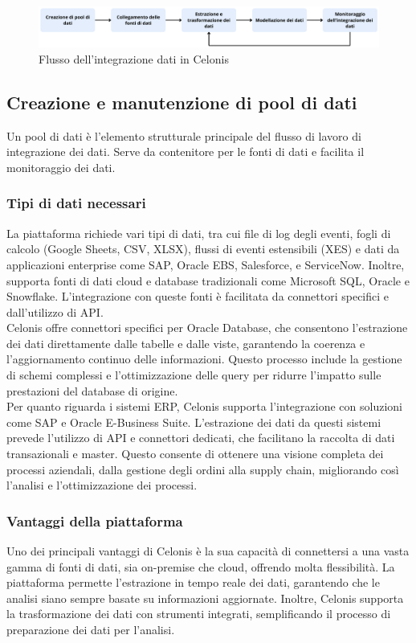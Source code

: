 \documentclass{article}
\begin{document}
\begin{figure}[H]
    \centering
    \includegraphics[width=\textwidth]{imgCelonis/IntegrazioneDati.png}
    \caption{Flusso dell'integrazione dati in Celonis}
    \label{fig:flusso-integrazione-dati-celonis}
\end{figure}

\subsection{Creazione e manutenzione di pool di dati}
Un pool di dati è l'elemento strutturale principale del flusso di lavoro di integrazione dei dati. Serve da contenitore per le fonti di dati e facilita il monitoraggio dei dati.

\subsubsection{Tipi di dati necessari}
La piattaforma richiede vari tipi di dati, tra cui file di log degli eventi, fogli di calcolo (Google Sheets, CSV, XLSX), flussi di eventi estensibili (XES) e dati da applicazioni enterprise come SAP, Oracle EBS, Salesforce, e ServiceNow. Inoltre, supporta fonti di dati cloud e database tradizionali come Microsoft SQL, Oracle e Snowflake. L'integrazione con queste fonti è facilitata da connettori specifici e dall'utilizzo di API.\\
Celonis offre connettori specifici per Oracle Database, che consentono l'estrazione dei dati direttamente dalle tabelle e dalle viste, garantendo la coerenza e l'aggiornamento continuo delle informazioni. Questo processo include la gestione di schemi complessi e l'ottimizzazione delle query per ridurre l'impatto sulle prestazioni del database di origine.\\
Per quanto riguarda i sistemi ERP, Celonis supporta l'integrazione con soluzioni come SAP e Oracle E-Business Suite. L'estrazione dei dati da questi sistemi prevede l'utilizzo di API e connettori dedicati, che facilitano la raccolta di dati transazionali e master. Questo consente di ottenere una visione completa dei processi aziendali, dalla gestione degli ordini alla supply chain, migliorando così l'analisi e l'ottimizzazione dei processi.

\subsubsection{Vantaggi della piattaforma}
Uno dei principali vantaggi di Celonis è la sua capacità di connettersi a una vasta gamma di fonti di dati, sia on-premise che cloud, offrendo molta flessibilità. La piattaforma permette l'estrazione in tempo reale dei dati, garantendo che le analisi siano sempre basate su informazioni aggiornate. Inoltre, Celonis supporta la trasformazione dei dati con strumenti integrati, semplificando il processo di preparazione dei dati per l'analisi.
\end{document}
